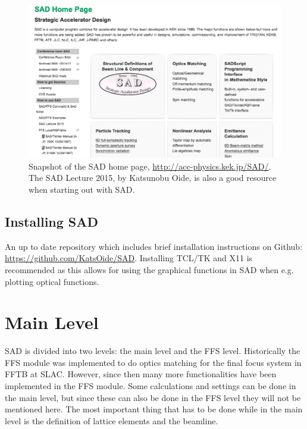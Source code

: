 \documentclass{article}
\begin{document}




\begin{figure}[h]
	\begin{center}
	\includegraphics[width=0.75\columnwidth]{figures/sadHomePage.png}
	\end{center}
	\caption{Snapshot of the SAD home page, \url{http://acc-physics.kek.jp/SAD/}. The SAD Lecture 2015, by Katsunobu Oide, is also a good resource when starting out with SAD.}
	\label{fig:sadHomePage}
\end{figure}


\subsection{Installing SAD}
An up to date repository which includes brief installation instructions on Github: \url{https://github.com/KatsOide/SAD}.
Installing TCL/TK and X11 is recommended as this allows for using the graphical functions in SAD when e.g. plotting optical functions.

\clearpage


\section{Main Level}
SAD is divided into two levels: the main level and the FFS level. Historically the FFS module was implemented to do optics matching for the final focus system in FFTB at SLAC.
However, since then many more functionalities have been implemented in the FFS module. Some calculations and settings can be done in the main level, but since these can also be done in the FFS level they will not be mentioned here. The most important thing that has to be done while in the main level is the definition of lattice elements and the beamline.
\end{document}
